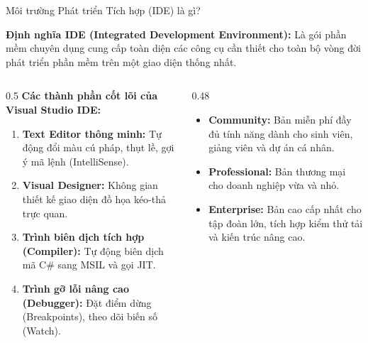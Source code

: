 \documentclass[aspectratio=169, 10pt]{beamer}
\begin{document}
\begin{frame}{Môi trường Phát triển Tích hợp (IDE) là gì?}
  \begin{block}{\textbf{Định nghĩa IDE (Integrated Development Environment):}}
    Là gói phần mềm chuyên dụng cung cấp toàn diện các công cụ cần thiết cho toàn bộ vòng đời phát triển phần mềm trên một giao diện thống nhất.
  \end{block}

  \begin{columns}[T]
    \begin{column}{0.5\textwidth}
      \textbf{Các thành phần cốt lõi của Visual Studio IDE:}
      \begin{enumerate}\small
        \item \textbf{Text Editor thông minh:} Tự động đổi màu cú pháp, thụt lề, gợi ý mã lệnh (IntelliSense).
        \item \textbf{Visual Designer:} Không gian thiết kế giao diện đồ họa kéo-thả trực quan.
        \item \textbf{Trình biên dịch tích hợp (Compiler):} Tự động biên dịch mã C\# sang MSIL và gọi JIT.
        \item \textbf{Trình gỡ lỗi nâng cao (Debugger):} Đặt điểm dừng (Breakpoints), theo dõi biến số (Watch).
      \end{enumerate}
    \end{column}

    \begin{column}{0.48\textwidth}
      \begin{tcolorbox}[colback=UniLightBlue!30,colframe=UniBlue,title=\textbf{Các phiên bản Visual Studio:},fonttitle=\small\bfseries]
        \begin{itemize}\footnotesize
          \item \textbf{Community:} Bản miễn phí đầy đủ tính năng dành cho sinh viên, giảng viên và dự án cá nhân.
          \item \textbf{Professional:} Bản thương mại cho doanh nghiệp vừa và nhỏ.
          \item \textbf{Enterprise:} Bản cao cấp nhất cho tập đoàn lớn, tích hợp kiểm thử tải và kiến trúc nâng cao.
        \end{itemize}
      \end{tcolorbox}
    \end{column}
  \end{columns}
\end{frame}
\end{document}
